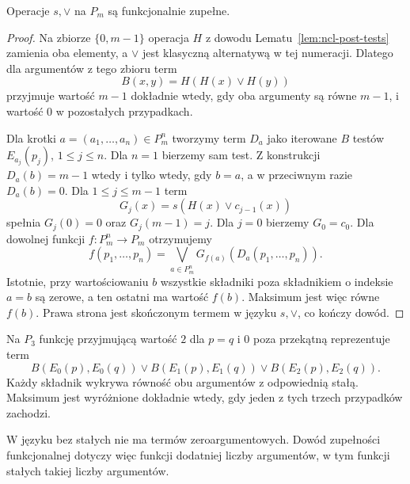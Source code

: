 \begin{twierdzenie}
\label{thm:ncl-post-functional-completeness}
Operacje $s,\vee$ na $P_m$ są funkcjonalnie zupełne.
\end{twierdzenie}
\begin{proof}
Na zbiorze $\{0,m-1\}$ operacja $H$ z dowodu
Lematu~\ref{lem:ncl-post-tests} zamienia oba elementy,
a $\vee$ jest klasyczną alternatywą w tej numeracji.
Dlatego dla argumentów z tego zbioru term
\[
 B(x,y)=H(H(x)\vee H(y))
\]
przyjmuje wartość $m-1$ dokładnie wtedy, gdy oba
argumenty są równe $m-1$, i wartość $0$ w pozostałych
przypadkach.

Dla krotki $a=(a_1,\ldots,a_n)\in P_m^n$
tworzymy term $D_a$ jako iterowane $B$ testów
$E_{a_j}(p_j)$, $1\leq j\leq n$. Dla $n=1$
bierzemy sam test. Z konstrukcji
$D_a(b)=m-1$ wtedy i tylko wtedy, gdy $b=a$,
a w przeciwnym razie $D_a(b)=0$.
Dla $1\leq j\leq m-1$ term
\[
 G_j(x)=s(H(x)\vee c_{j-1}(x))
\]
spełnia $G_j(0)=0$ oraz $G_j(m-1)=j$.
Dla $j=0$ bierzemy $G_0=c_0$.
Dla dowolnej funkcji $f:P_m^n\to P_m$ otrzymujemy
\[
 f(p_1,\ldots,p_n)=
 \bigvee_{a\in P_m^n} G_{f(a)}(D_a(p_1,\ldots,p_n)).
\]
Istotnie, przy wartościowaniu $b$ wszystkie składniki
poza składnikiem o indeksie $a=b$ są zerowe,
a ten ostatni ma wartość $f(b)$. Maksimum jest
więc równe $f(b)$. Prawa strona jest skończonym
termem w języku $s,\vee$, co kończy dowód.
\end{proof}

\begin{przyklad}
\label{ex:ncl-post-equality}
Na $P_3$ funkcję przyjmującą wartość $2$ dla $p=q$
i $0$ poza przekątną reprezentuje term
\[
 B(E_0(p),E_0(q))\vee
 B(E_1(p),E_1(q))\vee
 B(E_2(p),E_2(q)).
\]
Każdy składnik wykrywa równość obu argumentów
z odpowiednią stałą. Maksimum jest wyróżnione
dokładnie wtedy, gdy jeden z tych trzech przypadków
zachodzi.
\end{przyklad}
W języku bez stałych nie ma termów zeroargumentowych.
Dowód zupełności funkcjonalnej dotyczy więc funkcji
dodatniej liczby argumentów, w tym funkcji stałych
takiej liczby argumentów.

